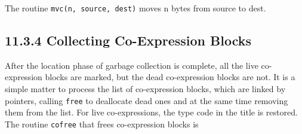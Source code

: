 The routine \texttt{mvc(n, source, dest)} moves n bytes from source to dest.

\subsection[11.3.4 Collecting Co-Expression Blocks]{11.3.4 Collecting Co-Expression Blocks}

After the location phase of garbage collection is complete, all the
live co-expression blocks are marked, but the dead co-expression
blocks are not. It is a simple matter to process the list of
co-expression blocks, which are linked by pointers, calling \texttt{free} to
deallocate dead ones and at the same time removing them from the
list. For live co-expressions, the type code in the title is
restored. The routine \texttt{cofree} that frees co-expression blocks is


